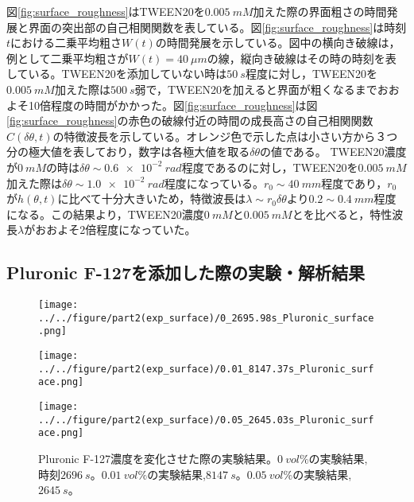 \documentclass[autodetect-engine,dvi=dvipdfmx,a4paper,ja=standard,oneside,openany,11pt]{bxjsbook}
\begin{document}
図\ref{fig:surface_roughness}はTWEEN20を$\SI{0.005}{mM}$加えた際の界面粗さの時間発展と界面の突出部の自己相関関数を表している。図\ref{fig:surface_roughness}は時刻$t$における二乗平均粗さ$W(t)$の時間発展を示している。図中の横向き破線は，例として二乗平均粗さが$W(t)=\SI{40}{\mu m}$の線，縦向き破線はその時の時刻を表している。TWEEN20を添加していない時は$\SI{50}{s}$程度に対し，TWEEN20を$\SI{0.005}{mM}$加えた際は$\SI{500}{s}$弱で，TWEEN20を加えると界面が粗くなるまでおおよそ10倍程度の時間がかかった。図\ref{fig:surface_roughness}は図\ref{fig:surface_roughness}の赤色の破線付近の時間の成長高さの自己相関関数$C(\delta\theta,t)$の特徴波長を示している。オレンジ色で示した点は小さい方から３つ分の極大値を表しており，数字は各極大値を取る$\delta \theta$の値である。
TWEEN20濃度が$\SI{0}{mM}$の時は$\delta\theta\sim\SI{0.6e-2}{rad}$程度であるのに対し，TWEEN20を$\SI{0.005}{mM}$加えた際は$\delta\theta\sim\SI{1.0e-2}{rad}$程度になっている。$r_0\sim\SI{40}{mm}$程度であり，$r_0$が$h(\theta,t)$に比べて十分大きいため，特徴波長は$\lambda\sim r_0\delta\theta$より$0.2\sim\SI{0.4}{mm}$程度になる。この結果より，TWEEN20濃度$\SI{0}{mM}$と$\SI{0.005}{mM}$とを比べると，特性波長$\lambda$がおおよそ2倍程度になっていた。

\subsection{Pluronic F-127を添加した際の実験・解析結果}
\begin{figure}[htbp]
  \begin{minipage}
    {0.32\textwidth}
    \subcaption{}
    \centering
    \texttt{[image: ../../figure/part2(exp\_surface)/0\_2695.98s\_Pluronic\_surface.png]}
    \label{fig:0_2695.98 s_Pluronic_surface}
  \end{minipage}
  \begin{minipage}
    {0.32\textwidth}
    \subcaption{}
    \centering
    \texttt{[image: ../../figure/part2(exp\_surface)/0.01\_8147.37s\_Pluronic\_surface.png]}
    \label{fig:0.01_8147.37 s_Pluronic_surface}
  \end{minipage}
  \begin{minipage}
    {0.32\textwidth}
    \subcaption{}
    \centering
    \texttt{[image: ../../figure/part2(exp\_surface)/0.05\_2645.03s\_Pluronic\_surface.png]}
    \label{fig:0.05_2645.03 s_Pluronic_surface}
  \end{minipage}
  \caption{Pluronic F-127濃度を変化させた際の実験結果。$\SI{0}{vol\%}$の実験結果, 時刻$\SI{2696}{s}$。$\SI{0.01}{vol\%}$の実験結果,$\SI{8147}{s}$。$\SI{0.05}{vol\%}$の実験結果, $\SI{2645}{s}$。}
  \label{fig:Pluronic_surface}
\end{figure}
\end{document}

